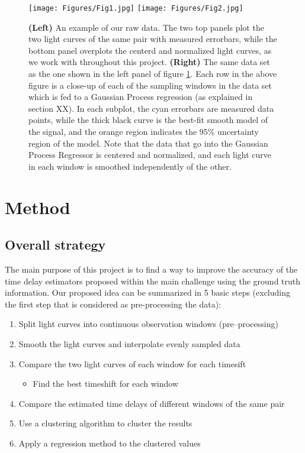 \documentclass[a4paper, 11pt]{article}
\begin{document}
\begin{figure}
\centering
\texttt{[image: Figures/Fig1.jpg]}
\texttt{[image: Figures/Fig2.jpg]}
\caption{{\bf (Left) }An example of our raw data. The two top panels plot the two light curves of the same pair with measured errorbars, while the bottom panel overplots the centerd and normalized light curves, as we work with throughout this project. {\bf (Right) }The same data set as the one shown in the left panel of figure \ref{fig:Fig1}. Each row in the above figure is a close-up of each of the sampling windows in the data set which is fed to a Gaussian Process regression (as explained in section XX). In each subplot, the cyan errorbars are measured data points, while the thick black curve is the best-fit smooth model of the signal, and the orange region indicates the 95\% uncertainty region of the model. Note that the data that go into the Gaussian Process Regressor is centered and normalized, and each light curve in each window is smoothed independently of the other.}
\label{fig:Fig1}
\end{figure}

\section{Method}
\subsection{Overall strategy}

The main purpose of this project is to find a way to improve the accuracy of the time delay estimators proposed within the main challenge using the ground truth information. Our proposed idea can be summarized in 5 basic steps (excluding the first step that is considered as pre-processing the data):

\begin{enumerate}
  \item Split light curves into continuous observation windows (pre--processing)
  \item Smooth the light curves and interpolate evenly sampled data
  \item Compare the two light curves of each window for each timesift
  \begin{itemize}
    \item Find the best timeshift for each window
  \end{itemize}
  \item Compare the estimated time delays of different windows of the same pair
  \item Use a clustering algorithm to cluster the results
  \item Apply a regression method to the clustered values
\end{enumerate}
\end{document}
